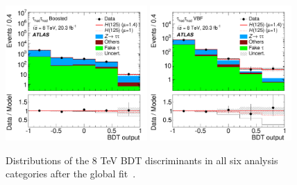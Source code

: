 \begin{figure}[tp]
  \includegraphics[width=0.48\textwidth]{figures/HIGG-2013-32/fig_08f}
  \includegraphics[width=0.48\textwidth]{figures/HIGG-2013-32/fig_08e}
  \caption{Distributions of the 8 TeV BDT discriminants in all six analysis categories after the global fit~\cite{HIGG-2013-32}.}
  \label{fig:results-bdts}
\end{figure}
\clearpage


